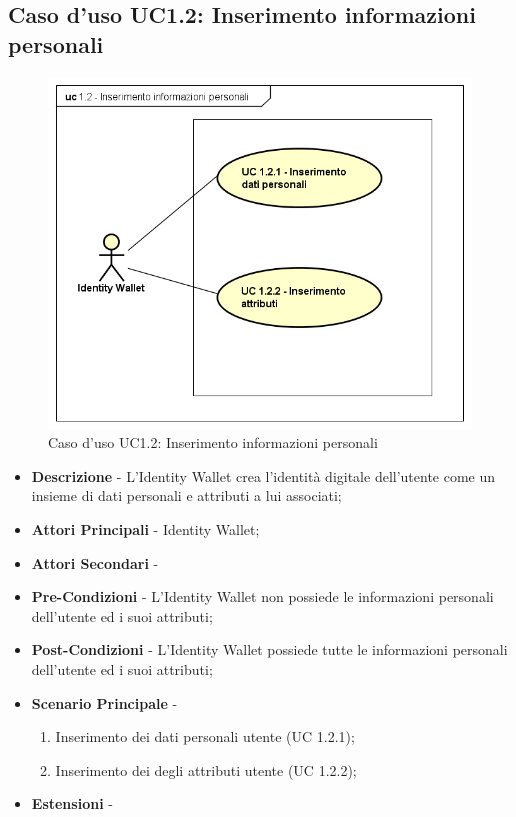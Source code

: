 \subsection{Caso d'uso UC1.2: Inserimento informazioni personali}
\begin{figure}[h]
	\centering
	\includegraphics[scale=0.50]{immagini/usecase/UC12_InserimentoInformazioniPersonalii}
	\caption{Caso d'uso UC1.2: Inserimento informazioni personali}
\end{figure}
\begin{itemize}
	\item \textbf{Descrizione} - L'Identity Wallet crea l'identità digitale dell'utente come un insieme di dati personali e attributi a lui associati;
	\item \textbf{Attori Principali} - Identity Wallet;
	\item \textbf{Attori Secondari} -
	\item \textbf{Pre-Condizioni} - L'Identity Wallet non possiede le informazioni personali dell'utente ed i suoi attributi;
	\item \textbf{Post-Condizioni} - L'Identity Wallet possiede tutte le informazioni personali dell'utente ed i suoi attributi;
	\item \textbf{Scenario Principale} -
	\begin{enumerate}
		\item Inserimento dei dati personali utente (UC 1.2.1);
		\item Inserimento dei degli attributi utente (UC 1.2.2);
	\end{enumerate}
	\item \textbf{Estensioni} -
\end{itemize}
